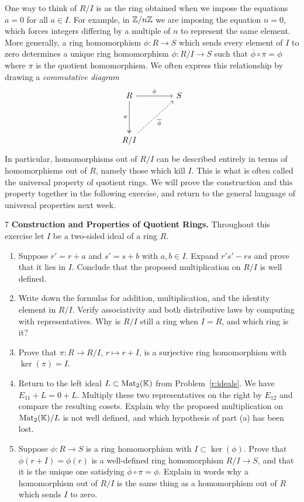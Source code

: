 \documentclass[Notebook.tex]{subfiles}
\begin{document}
One way to think of $R/I$ is as the ring obtained when we impose the equations $a=0$ for all $a\in I$. For example, in $\mathbb Z/n\mathbb Z$ we are imposing the equation $n=0$, which forces integers differing by a multiple of $n$ to represent the same element. More generally, a ring homomorphism $\phi:R\to S$ which sends every element of $I$ to zero determines a unique ring homomorphism $\overline{\phi}:R/I\to S$ such that $\overline{\phi}\circ\pi=\phi$ where $\pi$ is the quotient homomorphism. We often express this relationship by drawing a \emph{commutative diagram}
\[
\begin{tikzcd}[column sep=4em,row sep=4em]
	R \arrow[r,"\phi"] \arrow[d,two heads,"\pi"'] & S \\
	R/I \arrow[ur,dashed,"\overline\phi"'] &
\end{tikzcd}
\]
In particular, homomorphisms out of $R/I$ can be described entirely in terms of homomorphisms out of $R$, namely those which kill $I$. This is what is often called the universal property of quotient rings. We will prove the construction and this property together in the following exercise, and return to the general language of universal properties next week.

\hrulefill

\begin{problem}{7}\label{r:quotient}
	\textbf{Construction and Properties of Quotient Rings.} Throughout this exercise let $I$ be a two-sided ideal of a ring $R$.
	\begin{enumerate}[label=(\alph*),ref=\theenumi\alph*]
		\item Suppose $r'=r+a$ and $s'=s+b$ with $a,b\in I$. Expand $r's'-rs$ and prove that it lies in $I$. Conclude that the proposed multiplication on $R/I$ is well defined.
		\item Write down the formulas for addition, multiplication, and the identity element in $R/I$. Verify associativity and both distributive laws by computing with representatives. Why is $R/I$ still a ring when $I=R$, and which ring is it?
		\item Prove that $\pi:R\to R/I$, $r\mapsto r+I$, is a surjective ring homomorphism with $\ker(\pi)=I$.
		\item Return to the left ideal $L\subset \operatorname{Mat}_2(\mathbb K)$ from Problem~\ref{r:ideals}. We have $E_{11}+L=0+L$. Multiply these two representatives on the right by $E_{12}$ and compare the resulting cosets. Explain why the proposed multiplication on $\operatorname{Mat}_2(\mathbb K)/L$ is not well defined, and which hypothesis of part (a) has been lost.
		\item Suppose $\phi:R\to S$ is a ring homomorphism with $I\subset\ker(\phi)$. Prove that $\overline\phi(r+I)=\phi(r)$ is a well-defined ring homomorphism $R/I\to S$, and that it is the unique one satisfying $\overline\phi\circ\pi=\phi$. Explain in words why a homomorphism out of $R/I$ is the same thing as a homomorphism out of $R$ which sends $I$ to zero.
	\end{enumerate}
\end{problem}
\end{document}
